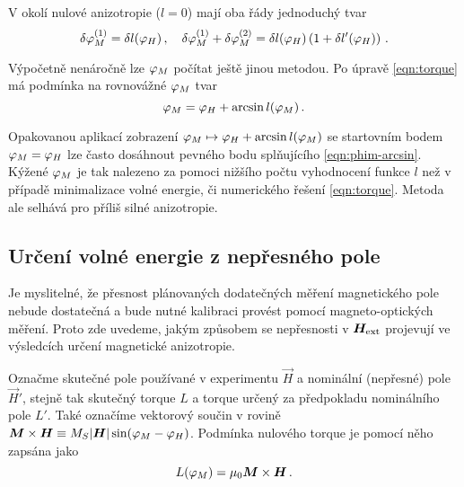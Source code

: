 V okolí nulové anizotropie ($l=0$) mají oba řády jednoduchý tvar
\begin{equation}
    \delta\varphi_M^{(1)} = \delta l(\varphi_H) \,,\quad \delta\varphi_M^{(1)}+\delta\varphi_M^{(2)} = \delta l(\varphi_H)\left( 1+\delta l'(\varphi_H) \right) \,.
\end{equation}

Výpočetně nenáročně lze $\varphi_M$ počítat ještě jinou metodou.
Po úpravě \eqref{eqn:torque} má podmínka na rovnovážné $\varphi_M$ tvar
\begin{equation}
    \label{eqn:phim-arcsin}
    \varphi_M = \varphi_H + \arcsin{l(\varphi_M)} \,.
\end{equation}

Opakovanou aplikací zobrazení $\varphi_M \mapsto \varphi_H + \arcsin{l(\varphi_M)}$ se startovním bodem $\varphi_M = \varphi_H$ lze často dosáhnout pevného bodu splňujícího \eqref{eqn:phim-arcsin}.
Kýžené $\varphi_M$ je tak nalezeno za pomoci nižšího počtu vyhodnocení funkce $l$ než v případě minimalizace volné energie, či numerického řešení \eqref{eqn:torque}.
Metoda ale selhává pro příliš silné anizotropie.

\subsection*{Určení volné energie z nepřesného pole}

Je myslitelné, že přesnost plánovaných dodatečných měření magnetického pole nebude dostatečná a bude nutné kalibraci provést pomocí magneto-optických měření.
Proto zde uvedeme, jakým způsobem se nepřesnosti v $\bm{H}_\textrm{ext}$ projevují ve výsledcích určení magnetické anizotropie.

Označme skutečné pole používané v experimentu $\vec{H}$ a nominální (nepřesné) pole $\vec{H}'$, stejně tak skutečný torque $L$ a torque určený za předpokladu nominálního pole $L'$.
Také označíme vektorový součin v rovině $\bm{M}\times\bm{H}\equiv M_S |\bm{H}|\sin(\varphi_M-\varphi_H)$.
Podmínka nulového torque je pomocí něho zapsána jako 
\begin{equation}
    \label{eqn:torque-soucin}
    L(\varphi_M) = \mu_0 \bm{M} \times \bm{H} \,.
\end{equation}


